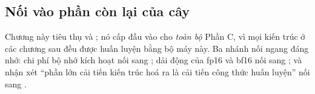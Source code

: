 \documentclass[../../deep_learning.tex]{subfiles}
\begin{document}
\subsection*{Nối vào phần còn lại của cây}
Chương này tiêu thụ  và ; nó cấp đầu vào cho \emph{toàn bộ} Phần C, vì mọi kiến trúc ở các chương sau đều được huấn luyện bằng bộ máy này. Ba nhánh nối ngang đáng nhớ: chi phí bộ nhớ kích hoạt nối sang ; dải động của fp16 và bf16 nối sang ; và nhận xét ``phần lớn cải tiến kiến trúc hoá ra là cải tiến công thức huấn luyện'' nối sang .
\end{document}
